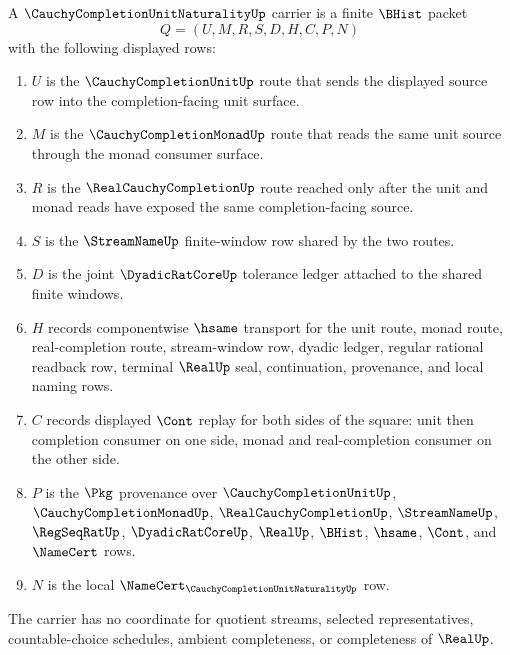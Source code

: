 \begin{definition}
\label{def:cauchy-completion-unit-naturality-carrier}
A $\CauchyCompletionUnitNaturalityUp$ carrier is a finite $\BHist$ packet
$$
Q=(U,M,R,S,D,H,C,P,N)
$$
with the following displayed rows:
\begin{enumerate}
\item $U$ is the $\CauchyCompletionUnitUp$ route that sends the displayed source row into the completion-facing unit surface.
\item $M$ is the $\CauchyCompletionMonadUp$ route that reads the same unit source through the monad consumer surface.
\item $R$ is the $\RealCauchyCompletionUp$ route reached only after the unit and monad reads have exposed the same completion-facing source.
\item $S$ is the $\StreamNameUp$ finite-window row shared by the two routes.
\item $D$ is the joint $\DyadicRatCoreUp$ tolerance ledger attached to the shared finite windows.
\item $H$ records componentwise $\hsame$ transport for the unit route, monad route, real-completion route, stream-window row, dyadic ledger, regular rational readback row, terminal $\RealUp$ seal, continuation, provenance, and local naming rows.
\item $C$ records displayed $\Cont$ replay for both sides of the square: unit then completion consumer on one side, monad and real-completion consumer on the other side.
\item $P$ is the $\Pkg$ provenance over $\CauchyCompletionUnitUp$, $\CauchyCompletionMonadUp$, $\RealCauchyCompletionUp$, $\StreamNameUp$, $\RegSeqRatUp$, $\DyadicRatCoreUp$, $\RealUp$, $\BHist$, $\hsame$, $\Cont$, and $\NameCert$ rows.
\item $N$ is the local $\NameCert_{\CauchyCompletionUnitNaturalityUp}$ row.
\end{enumerate}
The carrier has no coordinate for quotient streams, selected representatives, countable-choice schedules, ambient completeness, or completeness of $\RealUp$.
\end{definition}

